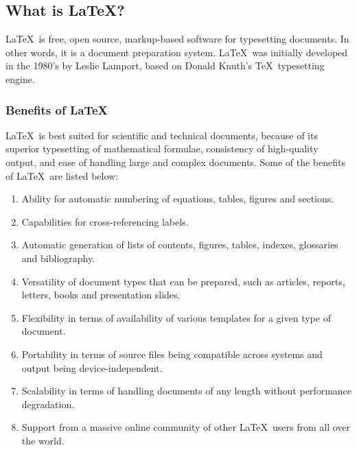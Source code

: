 	\subsection{What is \LaTeX?}
		\LaTeX\ is free, open source, markup-based software for typesetting documents. In other words, it is a document preparation system. \LaTeX\ was initially developed in the 1980's by Leslie Lamport, based on Donald Knuth's \TeX\ typesetting engine.
		
		\subsubsection{Benefits of \LaTeX}
			\LaTeX\ is best suited for scientific and technical documents, because of its superior typesetting of mathematical formulae, consistency of high-quality output, and ease of handling large and complex documents. Some of the benefits of \LaTeX\ are listed below:
			\begin{enumerate}
				\item Ability for automatic numbering of equations, tables, figures and sections.
				\item Capabilities for cross-referencing labels.
				\item Automatic generation of lists of contents, figures, tables, indexes, glossaries and bibliography.
				\item Versatility of document types that can be prepared, such as articles, reports, letters, books and presentation slides.
				\item Flexibility in terms of availability of various templates for a given type of document.
				\item Portability in terms of source files being compatible across systems and output being device-independent.
				\item Scalability in terms of handling documents of any length without performance degradation.
				\item Support from a massive online community of other \LaTeX\ users from all over the world.
			\end{enumerate}
			
